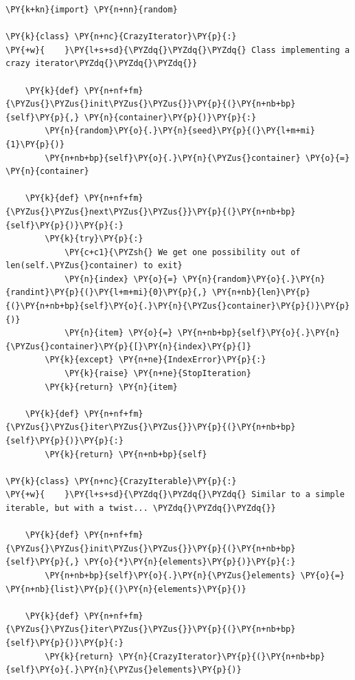 \begin{Verbatim}[label=\makebox{\url{https://github.com/lucabaldini/cmepda/tree/master/slides/latex/snippets/crazy\_iterator.py}},commandchars=\\\{\}]
\PY{k+kn}{import} \PY{n+nn}{random}

\PY{k}{class} \PY{n+nc}{CrazyIterator}\PY{p}{:}
\PY{+w}{    }\PY{l+s+sd}{\PYZdq{}\PYZdq{}\PYZdq{} Class implementing a crazy iterator\PYZdq{}\PYZdq{}\PYZdq{}}
    
    \PY{k}{def} \PY{n+nf+fm}{\PYZus{}\PYZus{}init\PYZus{}\PYZus{}}\PY{p}{(}\PY{n+nb+bp}{self}\PY{p}{,} \PY{n}{container}\PY{p}{)}\PY{p}{:}
        \PY{n}{random}\PY{o}{.}\PY{n}{seed}\PY{p}{(}\PY{l+m+mi}{1}\PY{p}{)}
        \PY{n+nb+bp}{self}\PY{o}{.}\PY{n}{\PYZus{}container} \PY{o}{=} \PY{n}{container}
    
    \PY{k}{def} \PY{n+nf+fm}{\PYZus{}\PYZus{}next\PYZus{}\PYZus{}}\PY{p}{(}\PY{n+nb+bp}{self}\PY{p}{)}\PY{p}{:}
        \PY{k}{try}\PY{p}{:}
            \PY{c+c1}{\PYZsh{} We get one possibility out of len(self.\PYZus{}container) to exit}
            \PY{n}{index} \PY{o}{=} \PY{n}{random}\PY{o}{.}\PY{n}{randint}\PY{p}{(}\PY{l+m+mi}{0}\PY{p}{,} \PY{n+nb}{len}\PY{p}{(}\PY{n+nb+bp}{self}\PY{o}{.}\PY{n}{\PYZus{}container}\PY{p}{)}\PY{p}{)}
            \PY{n}{item} \PY{o}{=} \PY{n+nb+bp}{self}\PY{o}{.}\PY{n}{\PYZus{}container}\PY{p}{[}\PY{n}{index}\PY{p}{]}
        \PY{k}{except} \PY{n+ne}{IndexError}\PY{p}{:}
            \PY{k}{raise} \PY{n+ne}{StopIteration}
        \PY{k}{return} \PY{n}{item}
    
    \PY{k}{def} \PY{n+nf+fm}{\PYZus{}\PYZus{}iter\PYZus{}\PYZus{}}\PY{p}{(}\PY{n+nb+bp}{self}\PY{p}{)}\PY{p}{:}
        \PY{k}{return} \PY{n+nb+bp}{self}

\PY{k}{class} \PY{n+nc}{CrazyIterable}\PY{p}{:}
\PY{+w}{    }\PY{l+s+sd}{\PYZdq{}\PYZdq{}\PYZdq{} Similar to a simple iterable, but with a twist... \PYZdq{}\PYZdq{}\PYZdq{}}
    
    \PY{k}{def} \PY{n+nf+fm}{\PYZus{}\PYZus{}init\PYZus{}\PYZus{}}\PY{p}{(}\PY{n+nb+bp}{self}\PY{p}{,} \PY{o}{*}\PY{n}{elements}\PY{p}{)}\PY{p}{:}
        \PY{n+nb+bp}{self}\PY{o}{.}\PY{n}{\PYZus{}elements} \PY{o}{=} \PY{n+nb}{list}\PY{p}{(}\PY{n}{elements}\PY{p}{)}
    
    \PY{k}{def} \PY{n+nf+fm}{\PYZus{}\PYZus{}iter\PYZus{}\PYZus{}}\PY{p}{(}\PY{n+nb+bp}{self}\PY{p}{)}\PY{p}{:}
        \PY{k}{return} \PY{n}{CrazyIterator}\PY{p}{(}\PY{n+nb+bp}{self}\PY{o}{.}\PY{n}{\PYZus{}elements}\PY{p}{)}
\end{Verbatim}
